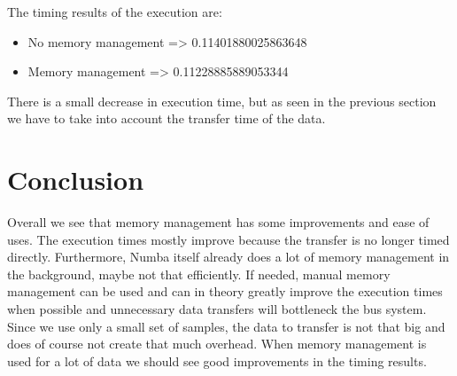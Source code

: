 The timing results of the execution are:
\begin{itemize}
    \item No memory management => 0.11401880025863648
    \item Memory management => 0.11228885889053344
\end{itemize}

There is a small decrease in execution time, but as seen in the previous section we have to take into account the transfer time of the data.

\newpage
\section{Conclusion}
\label{sec:conclusion}

Overall we see that memory management has some improvements and ease of uses. The execution times mostly improve because the transfer is no longer timed directly. Furthermore, Numba itself already does a lot of memory management in the background, maybe not that efficiently. If needed, manual memory management can be used and can in theory greatly improve the execution times when possible and unnecessary data transfers will bottleneck the bus system. Since we use only a small set of samples, the data to transfer is not that big and does of course not create that much overhead. When memory management is used for a lot of data we should see good improvements in the timing results.